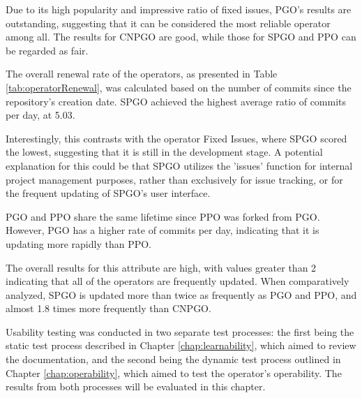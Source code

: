 Due to its high popularity and impressive ratio of fixed issues, PGO's results are outstanding, suggesting that it can be considered the most reliable operator among all.
The results for CNPGO are good, while those for SPGO and PPO can be regarded as fair.


The overall renewal rate of the operators, as presented in Table \ref{tab:operatorRenewal}, was calculated based on the number of commits since the repository's creation date. SPGO achieved the highest average ratio of commits per day, at 5.03.

Interestingly, this contrasts with the operator Fixed Issues, where SPGO scored the lowest, suggesting that it is still in the development stage.
A potential explanation for this could be that SPGO utilizes the 'issues' function for internal project management purposes,
rather than exclusively for issue tracking, or for the frequent updating of SPGO’s user interface.

PGO and PPO share the same lifetime since PPO was forked from PGO. However, PGO has a higher rate of commits per day, indicating that it is updating more rapidly than PPO.

The overall results for this attribute are high, with values greater than 2 indicating that all of the operators are frequently updated.
When comparatively analyzed, SPGO is updated more than twice as frequently as PGO and PPO, and almost 1.8 times more frequently than CNPGO.


Usability testing was conducted in two separate test processes: the first being the static test process described in Chapter \ref{chap:learnability}, which aimed to review the documentation,
and the second being the dynamic test process outlined in Chapter \ref{chap:operability}, which aimed to test the operator's operability.
The results from both processes will be evaluated in this chapter.

